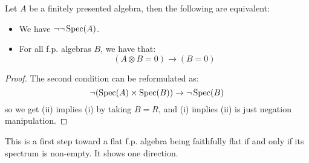 \begin{lemma}
Let $A$ be a finitely presented algebra, then the following are equivalent:
\begin{itemize}[(i)]
\item We have $\neg\neg\operatorname{Spec}(A)$.
\item For all f.p. algebras $B$, we have that:
\[(A\otimes B = 0) \to (B=0)\]
\end{itemize}
\end{lemma}

\begin{proof}
The second condition can be reformulated as:
\[\neg(\operatorname{Spec}(A)\times\operatorname{Spec}(B))\to \neg\operatorname{Spec}(B)\]
so we get (ii) implies (i) by taking $B=R$, and (i) implies (ii) is just negation manipulation.
\end{proof}

This is a first step toward a flat f.p. algebra being faithfully flat if and only if its spectrum is non-empty. It shows one direction.
